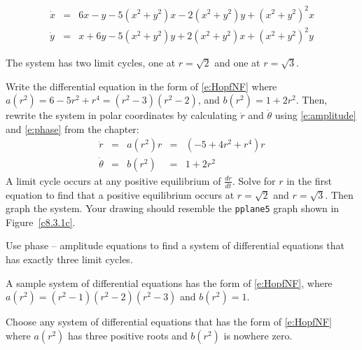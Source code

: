 \documentclass{ximera}
\begin{document}
\begin{exercise} \label{c8.3.1c}
\[ 
\begin{array}{rcl}
\dot{x} & = &  6x-y - 5(x^2+y^2)x - 2(x^2+y^2)y + (x^2+y^2)^2x\\
\dot{y} & = &  x+6y - 5(x^2+y^2)y + 2(x^2+y^2)x + (x^2+y^2)^2y
\end{array}
\]

\begin{solution}

\ans The system has two limit cycles, one at $r = \sqrt{2}$ and one
at $r = \sqrt{3}$. 

\soln Write the differential equation in the form of \eqref{e:HopfNF}
where $a(r^2) = 6 - 5r^2 + r^4=(r^2-3)(r^2-2)$, and 
$b(r^2) = 1+2r^2$.  Then,
rewrite the system in polar coordinates by calculating $\dot{r}$ and
$\dot{\theta}$ using \eqref{e:amplitude} and \eqref{e:phase} from the
chapter:
\[ 
\begin{array}{rcccl}
\dot{r} & = & a(r^2)r & = & (-5 + 4r^2 + r^4)r \\
\dot{\theta} & = & b(r^2) & = & 1+2r^2 \end{array}
\]
A limit cycle occurs at any positive equilibrium of $\frac{dr}{dt}$.
Solve for $r$ in the first equation to find that a positive equilibrium 
occurs at $r = \sqrt{2}$ and $r = \sqrt{3}$.  Then graph the system.  Your 
drawing should resemble the {\tt pplane5} graph shown in Figure~\ref{c8.3.1c}.

\begin{figure}[htb]
                       \centerline{%
                       }
\end{figure}


\end{solution}
\end{exercise}

\begin{exercise} \label{c8.3.4}
Use phase -- amplitude equations to find a system of differential equations 
that has exactly three limit cycles.

\begin{solution}

\soln A sample system of differential equations has the form of 
\eqref{e:HopfNF}, where $a(r^2) = (r^2-1)(r^2-2)(r^2-3)$
and $b(r^2) = 1$.

\soln  Choose any system of differential equations that has the form of 
\eqref{e:HopfNF} where $a(r^2)$ has three positive roots
and $b(r^2)$ is nowhere zero.


\end{solution}
\end{exercise}
\end{document}

